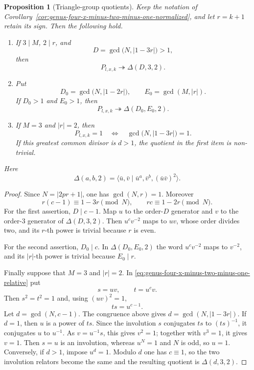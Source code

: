 \documentclass{article}
\newtheorem{prop}[theorem]{Proposition}
\begin{document}
\begin{prop}[Triangle-group quotients]
\label{prop:genus-four-x-minus-two-minus-one-triangle-tests}
Keep the notation of
Corollary~\ref{cor:genus-four-x-minus-two-minus-one-normalized}, and let
$r=k+1$ retain its sign.  Then the following hold.

\begin{enumerate}
\item If $3\mid M$, $2\mid r$, and
\[
       D=\gcd\bigl(N,|1-3r|\bigr)>1,
\]
then
\[
       P_{l,x,k}\twoheadrightarrow \Delta(D,3,2).
\]

\item Put
\[
 D_0=\gcd\bigl(N,|1-2r|\bigr),
 \qquad
 E_0=\gcd(M,|r|).
\]
If $D_0>1$ and $E_0>1$, then
\[
       P_{l,x,k}\twoheadrightarrow \Delta(D_0,E_0,2).
\]

\item If $M=3$ and $|r|=2$, then
\[
 P_{l,x,k}=1
 \quad\Longleftrightarrow\quad
 \gcd\bigl(N,|1-3r|\bigr)=1.
\]
If this greatest common divisor is $d>1$, the quotient in the first item is
non-trivial.
\end{enumerate}
Here
\[
 \Delta(a,b,2)=\langle \bar u,\bar v\mid
 \bar u^a,\bar v^b,(\bar u\bar v)^2\rangle .
\]
\end{prop}

\begin{proof}
Since $N=|2pr+1|$, one has $\gcd(N,r)=1$.  Moreover
\[
 r(c-1)\equiv1-3r\pmod N,
 \qquad
 rc\equiv1-2r\pmod N.
\]
For the first assertion, $D\mid c-1$.  Map $u$ to the order-$D$
generator and $v$ to the order-$3$ generator of $\Delta(D,3,2)$.
Then $u^cv^{-2}$ maps to $uv$, whose order divides two, and its $r$-th
power is trivial because $r$ is even.

For the second assertion, $D_0\mid c$.  In
$\Delta(D_0,E_0,2)$ the word $u^cv^{-2}$ maps to $v^{-2}$, and its
$|r|$-th power is trivial because $E_0\mid r$.

Finally suppose that $M=3$ and $|r|=2$.  In
\eqref{eq:genus-four-x-minus-two-minus-one-relative} put
\[
       s=uv,\qquad t=u^cv.
\]
Then $s^2=t^2=1$ and, using $(uv)^2=1$,
\[
       ts=u^{c-1}.
\]
Let $d=\gcd(N,c-1)$.  The congruence above gives
$d=\gcd(N,|1-3r|)$.  If $d=1$, then $u$ is a power of $ts$.
Since the involution $s$ conjugates $ts$ to $(ts)^{-1}$, it conjugates
$u$ to $u^{-1}$.  As $v=u^{-1}s$, this gives $v^2=1$; together with
$v^3=1$, it gives $v=1$.  Then $s=u$ is an involution, whereas $u^N=1$
and $N$ is odd, so $u=1$.  Conversely, if $d>1$, impose $u^d=1$.
Modulo $d$ one has $c\equiv1$, so the two involution relators become the
same and the resulting quotient is $\Delta(d,3,2)$.
\end{proof}
\end{document}
